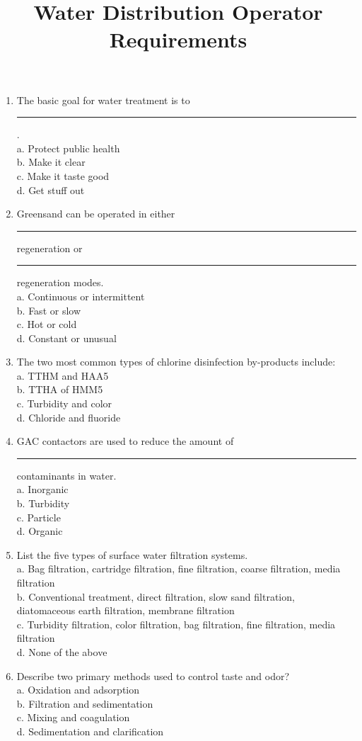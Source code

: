 \documentclass[10pt]{article}
\title{Water Distribution Operator Requirements }
\author{}
\date{}
\begin{document}
\begin{enumerate}
\item The basic goal for water treatment is to \rule{2cm}{0.3pt}.\\
a.  Protect public health\\
b.  Make it clear\\
c.  Make it taste good\\
d.  Get stuff out\\

\item Greensand can be operated in either \rule{2cm}{0.5pt} regeneration or \rule{2cm}{0.5pt} regeneration modes.\\
a.  Continuous or intermittent\\
b.  Fast or slow\\
c.  Hot or cold\\
d.  Constant or unusual\\

\item The two most common types of chlorine disinfection by-products include:\\
a.  TTHM and HAA5\\
b.  TTHA of HMM5\\
c.  Turbidity and color\\
d.  Chloride and fluoride\\

\item GAC contactors are used to reduce the amount of \rule{2cm}{0.5pt} contaminants in water.\\
a.  Inorganic\\
b.  Turbidity\\
c.  Particle\\
d.  Organic\\

\item List the five types of surface water filtration systems.\\
a.  Bag filtration, cartridge filtration, fine filtration, coarse filtration, media filtration\\
b.  Conventional treatment, direct filtration, slow sand filtration, diatomaceous earth filtration, membrane filtration\\
c.  Turbidity filtration, color filtration, bag filtration, fine filtration, media filtration\\
d.  None of the above\\

\item Describe two primary methods used to control taste and odor?\\
a.  Oxidation and adsorption\\
b.  Filtration and sedimentation\\
c.  Mixing and coagulation\\
d.  Sedimentation and clarification\\


\end{enumerate}
\end{document}
